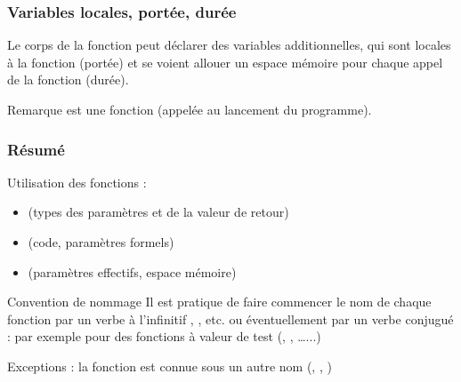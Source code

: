 \documentclass[xcolor=pdftex,svgnames,table]{beamer}
\begin{document}
\begin{frame}
    \frametitle{Variables locales, portée, durée}

    Le corps de la fonction peut déclarer des variables additionnelles,
    qui sont locales à la fonction (portée) et se voient allouer un
    espace mémoire pour chaque appel de la fonction (durée).

    \begin{block}{Remarque}  est une fonction (appelée au lancement du
      programme).
    \end{block}
\end{frame}


\begin{frame}
  \frametitle{Résumé}
 Utilisation des fonctions :
  \begin{itemize}
    \item {} (types des paramètres et de la valeur de retour)
    \item {}  (code, paramètres formels)
    \item {} (paramètres effectifs, espace mémoire)
  \end{itemize}
\pause
\begin{block}{Convention de nommage}
  Il est pratique de faire commencer le nom de chaque fonction par un
  verbe à l'infinitif , ,
  etc. ou éventuellement par un verbe conjugué : par exemple 
  pour des fonctions à valeur de test (,
  , \ldots...)

Exceptions : la fonction est connue sous un autre nom
  (, , )
\end{block}
\end{frame}
\end{document}
